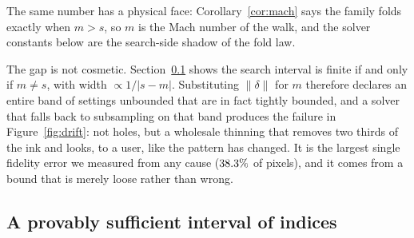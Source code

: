 The same number has a physical face: Corollary~\ref{cor:mach} says the family
folds exactly when $m>s$, so $m$ is the Mach number of the walk, and the
solver constants below are the search-side shadow of the fold law.

The gap is not cosmetic. Section~\ref{sec:window} shows the search interval is
finite if and only if $m \neq s$, with width $\propto 1/|s-m|$. Substituting
$\lVert\delta\rVert$ for $m$ therefore declares an entire band of settings
unbounded that are in fact tightly bounded, and a solver that falls back to
subsampling on that band produces the failure in Figure~\ref{fig:drift}: not holes,
but a wholesale thinning that removes two thirds of the ink and looks, to a user,
like the pattern has changed. It is the largest single fidelity error we measured
from any cause ($38.3\%$ of pixels), and it comes from a bound that
is merely loose rather than wrong.

\subsection{A provably sufficient interval of indices}
\label{sec:window}

